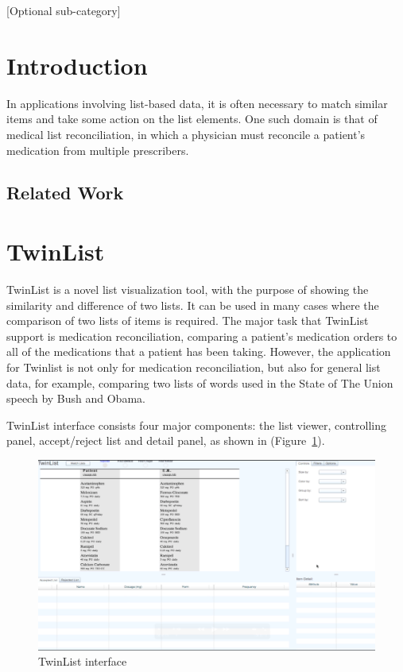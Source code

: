 \documentclass{chi2009}
\begin{document}

[Optional sub-category]

\section{Introduction}
In applications involving list-based data, it is often necessary to match similar items and take some action on the list elements. One such domain is that of medical list reconciliation, in which a physician must reconcile a patient's medication from multiple prescribers.
\subsection{Related Work}

\section{TwinList}
TwinList is a novel list visualization tool, with the purpose of showing the similarity and difference of two lists. It can be used in many cases where the comparison of two lists of items is required. The major task that TwinList support is medication reconciliation, comparing a patient's medication orders to all of the medications that a patient has been taking\cite{JCAHO-2006}.  However, the application for Twinlist is not only for medication reconciliation, but also for general list data, for example, comparing two lists of words used in the State of The Union speech by Bush and Obama. 

TwinList interface consists four major components: the list viewer, controlling panel, accept/reject list and detail panel, as shown in (Figure~\ref{interface}).


\begin{figure}
\begin{center}
\includegraphics[width=1.1\linewidth]{interface}
\end{center}
   \caption{TwinList interface}
   \label{interface}
\end{figure}
\end{document}
